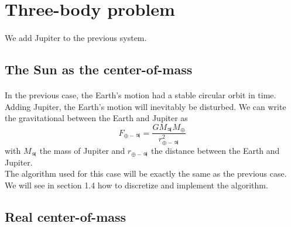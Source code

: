 \documentclass[a4paper, twoside, 11pt]{report}
\theoremstyle{theorem}
\theoremstyle{remark}
\theoremstyle{exemple}
\begin{document}
                        
    
    \section{Three-body problem}
        \paragraph{}We add Jupiter to the previous system.
        
        \subsection{The Sun as the center-of-mass}
            \paragraph{}In the previous case, the Earth's motion had a stable circular orbit in time. Adding Jupiter, the Earth's motion will inevitably be disturbed. We can write the gravitational between the Earth and Jupiter as 
                \begin{equation*}
                    F_{\oplus-\jupiter} = \frac{GM_{\jupiter}M_{\oplus}}{r_{\oplus-\jupiter}^2} 
                \end{equation*}
            with $M_{\jupiter}$ the mass of Jupiter and $r_{\oplus - \jupiter}$ the distance between the Earth and Jupiter. \\
            The algorithm used for this case will be exactly the same as the previous case. We will see in section 1.4 how to discretize and implement the algorithm. 
            
        \subsection{Real center-of-mass}
\end{document}
